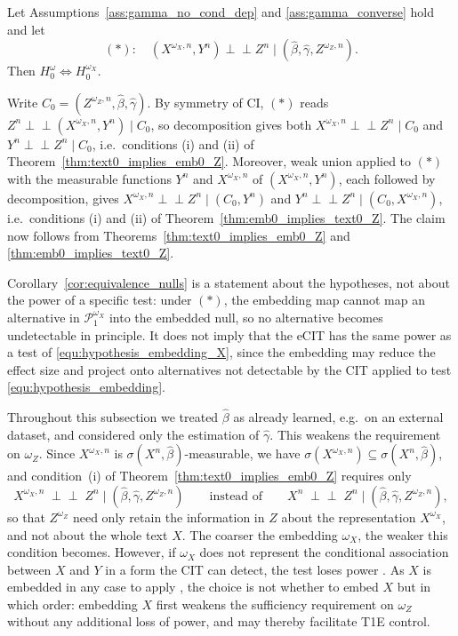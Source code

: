 \documentclass[twoside,11pt]{article}
\newcommand{\indep}{\perp \!\!\! \perp}
\begin{document}
\begin{corollaryE}[][end, no link to proof, text proof={Proof of Corollary \ref{cor:equivalence_nulls}}]\label{cor:equivalence_nulls}
Let Assumptions~\ref{ass:gamma_no_cond_dep} and \ref{ass:gamma_converse} hold and let
\[
(*):\quad (X^{\omega_X,n},Y^n)\indep Z^n\mid (\hat\beta,\hat\gamma,Z^{\omega_Z,n}).
\]
Then $H_0^\omega\iff H_0^{\omega_X}$.
\end{corollaryE}
\begin{proofE}
Write $C_0=(Z^{\omega_Z,n},\hat\beta,\hat\gamma)$. By symmetry of CI, $(*)$ reads $Z^n\indep (X^{\omega_X,n},Y^n)\mid C_0$, so decomposition gives both $X^{\omega_X,n}\indep Z^n\mid C_0$ and $Y^n\indep Z^n\mid C_0$, i.e.\ conditions (i) and (ii) of Theorem~\ref{thm:text0_implies_emb0_Z}. Moreover, weak union applied to $(*)$ with the measurable functions $Y^n$ and $X^{\omega_X,n}$ of $(X^{\omega_X,n},Y^n)$, each followed by decomposition, gives $X^{\omega_X,n}\indep Z^n\mid (C_0,Y^n)$ and $Y^n\indep Z^n\mid (C_0,X^{\omega_X,n})$, i.e.\ conditions (i) and (ii) of Theorem~\ref{thm:emb0_implies_text0_Z}. The claim now follows from Theorems~\ref{thm:text0_implies_emb0_Z} and \ref{thm:emb0_implies_text0_Z}.
\end{proofE}

Corollary~\ref{cor:equivalence_nulls} is a statement about the hypotheses, not about the power of a specific test: under $(*)$, the embedding map cannot map an alternative in $\mathcal{P}_1^{\omega_X}$ into the embedded null, so no alternative becomes undetectable in principle. It does not imply that the eCIT has the same power as a test of \eqref{equ:hypothesis_embedding_X}, since the embedding may reduce the effect size and project onto alternatives not detectable by the CIT applied to test \eqref{equ:hypothesis_embedding}.


Throughout this subsection we treated $\hat\beta$ as already learned, e.g.\ on an external dataset, and considered only the estimation of $\hat\gamma$. This weakens the requirement on $\omega_Z$. Since $X^{\omega_X,n}$ is $\sigma(X^n,\hat\beta)$-measurable, we have $\sigma(X^{\omega_X,n})\subseteq\sigma(X^n,\hat\beta)$, and condition~(i) of Theorem~\ref{thm:text0_implies_emb0_Z} requires only
\[
  X^{\omega_X,n}\;\indep\;Z^n \mid (\hat\beta,\hat\gamma,Z^{\omega_Z,n})
  \qquad\text{instead of}\qquad
  X^{n}\;\indep\;Z^n \mid (\hat\beta,\hat\gamma,Z^{\omega_Z,n}),
\]
so that $Z^{\omega_Z}$ need only retain the information in $Z$ about the representation $X^{\omega_X}$, and not about the whole text $X$. The coarser the embedding $\omega_X$, the weaker this condition becomes. %
However, if $\omega_X$ does not represent the conditional association between $X$ and $Y$ in a form the CIT can detect, the test loses power \citep{simnacher2026deep}.
As $X$ is embedded in any case to apply \citet{simnacher2026deep}, the choice is not whether to embed $X$ but in which order: embedding $X$ first weakens the sufficiency requirement on $\omega_Z$ without any additional loss of power, and may thereby facilitate T1E control.
\end{document}
